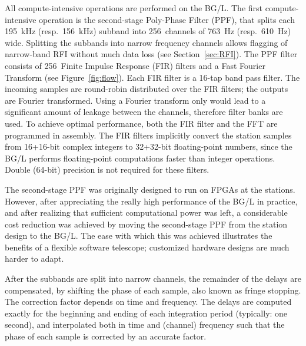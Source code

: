 \documentclass[journal]{IEEEtran}
\begin{document}
All compute-intensive operations are performed on the BG/L.
The first compute-intensive operation is the second-stage Poly-Phase Filter
(PPF), that splits each 195~kHz (resp.\ 156~kHz) subband into 256~channels of
763~Hz (resp.\ 610~Hz) wide.
Splitting the subbands into narrow frequency channels allows flagging
of narrow-band RFI without much data loss (see Section~\ref{sec:RFI}).
The PPF filter consists of 256~Finite Impulse Response (FIR) filters and a
Fast Fourier Transform (see Figure~\ref{fig:flow}).
Each FIR filter is a 16-tap band pass filter.
The incoming samples are round-robin distributed over the FIR filters;
the outputs are Fourier transformed.
Using a Fourier transform only would lead to a significant amount of leakage
between the channels, therefore filter banks are used.
To achieve optimal performance, both the FIR filter and the FFT are programmed
in assembly.
The FIR filters implicitly convert the station samples from 16+16-bit complex
integers to 32+32-bit floating-point numbers, since the BG/L performs
floating-point computations faster than integer operations.
Double (64-bit) precision is not required for these filters.

The second-stage PPF was originally designed to run on FPGAs at the stations.
However, after appreciating the really high performance of the BG/L in
practice, and after realizing that sufficient computational power was left, a
considerable cost reduction was achieved by moving the second-stage PPF from
the station design to the BG/L.
The ease with which this was achieved illustrates the benefits of a flexible
software telescope; customized hardware designs are much harder to adapt.

After the subbands are split into narrow channels, the remainder of the
delays are compensated, by shifting the phase of each sample, also known as
fringe stopping.
The correction factor depends on time and frequency.
The delays are computed exactly for the beginning and ending of each
integration period (typically: one second), and interpolated both in time
and (channel) frequency such that the phase of each sample is corrected by
an accurate factor.
\end{document}
